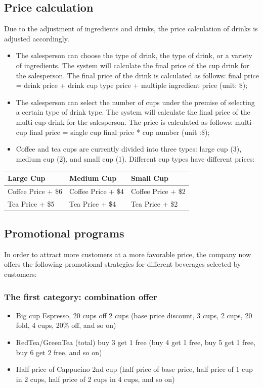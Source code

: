 \documentclass[a4paper]{report}
\begin{document}
\subsection{Price calculation}
Due to the adjustment of ingredients and drinks, the price calculation of drinks is adjusted accordingly.
\begin{itemize}
\item
The salesperson can choose the type of drink, the type of drink, or a variety of ingredients. The system will calculate the final price of the cup drink for the salesperson. The final price of the drink is calculated as follows: final price = drink price + drink cup type price + multiple ingredient price (unit: \$);
\item
The salesperson can select the number of cups under the premise of selecting a certain type of drink type. The system will calculate the final price of the multi-cup drink for the salesperson. The price is calculated as follows: multi-cup final price = single cup final price * cup number (unit :\$);
\item
Coffee and tea cups are currently divided into three types: large cup (3), medium cup (2), and small cup (1). Different cup types have different prices:
\end{itemize}
\begin{table}[htbp]
\center
\begin{tabular}{|l|l|l|}
\hline
\rowcolor[HTML]{575C61} 
{\color[HTML]{FFFFFF} \textbf{Large Cup}} & {\color[HTML]{FFFFFF} \textbf{Medium Cup}} & {\color[HTML]{FFFFFF}\textbf{Small Cup} } \\ \hline
Coffee Price +  \$6&Coffee Price +  \$4&Coffee Price +  \$2\\\hline
Tea Price +  \$5&Tea Price +  \$4&Tea Price +  \$2\\\hline
\end{tabular}
\end{table}
\subsection{Promotional programs}
In order to attract more customers at a more favorable price, the company now offers the following promotional strategies for different beverages selected by customers:
\subsubsection{The first category: combination offer}
\begin{itemize}
\item
Big cup Espresso, 20 cups off 2 cups (base price discount, 3 cups, 2 cups, 20 fold, 4 cups, 20\% off, and so on)
\item
RedTea/GreenTea (total) buy 3 get 1 free (buy 4 get 1 free, buy 5 get 1 free, buy 6 get 2 free, and so on)
\item 
Half price of Cappucino 2nd cup (half price of base price, half price of 1 cup in 2 cups, half price of 2 cups in 4 cups, and so on)
\end{itemize}
\end{document}
